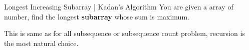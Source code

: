 
\begin{problem}{Longest Increasing Subarray | Kadan's Algorithm}
    You are given a array of number, find the longest \textbf{subarray} whose sum is maximum.
\end{problem}

\begin{solution}
    This is same as for all subsequence or subsequence count problem, recursion is the most natural choice.

    

    
\end{solution}